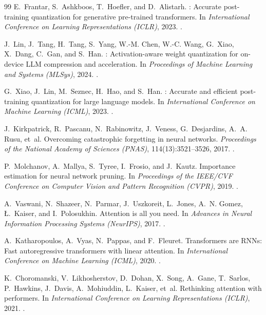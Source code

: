 \begin{thebibliography}{99}
E.~Frantar, S.~Ashkboos, T.~Hoefler, and D.~Alistarh.
: Accurate post-training quantization for generative pre-trained transformers.
\newblock In \emph{International Conference on Learning Representations (ICLR)}, 2023.
\newblock {}.

J.~Lin, J.~Tang, H.~Tang, S.~Yang, W.-M. Chen, W.-C. Wang, G.~Xiao, X.~Dang, C.~Gan, and S.~Han.
: Activation-aware weight quantization for on-device {LLM} compression and acceleration.
\newblock In \emph{Proceedings of Machine Learning and Systems (MLSys)}, 2024.
\newblock {}.

G.~Xiao, J.~Lin, M.~Seznec, H.~Hao, and S.~Han.
: Accurate and efficient post-training quantization for large language models.
\newblock In \emph{International Conference on Machine Learning (ICML)}, 2023.
\newblock {}.

J.~Kirkpatrick, R.~Pascanu, N.~Rabinowitz, J.~Veness, G.~Desjardins, A.~A. Rusu, et~al.
\newblock Overcoming catastrophic forgetting in neural networks.
\newblock \emph{Proceedings of the National Academy of Sciences (PNAS)}, 114(13):3521--3526, 2017.
\newblock {}.

P.~Molchanov, A.~Mallya, S.~Tyree, I.~Frosio, and J.~Kautz.
\newblock Importance estimation for neural network pruning.
\newblock In \emph{Proceedings of the IEEE/CVF Conference on Computer Vision and Pattern Recognition (CVPR)}, 2019.
\newblock {}.

A.~Vaswani, N.~Shazeer, N.~Parmar, J.~Uszkoreit, L.~Jones, A.~N. Gomez, {\L}.~Kaiser, and I.~Polosukhin.
\newblock Attention is all you need.
\newblock In \emph{Advances in Neural Information Processing Systems (NeurIPS)}, 2017.
\newblock {}.

A.~Katharopoulos, A.~Vyas, N.~Pappas, and F.~Fleuret.
\newblock Transformers are {RNN}s: Fast autoregressive transformers with linear attention.
\newblock In \emph{International Conference on Machine Learning (ICML)}, 2020.
\newblock {}.

K.~Choromanski, V.~Likhosherstov, D.~Dohan, X.~Song, A.~Gane, T.~Sarlos, P.~Hawkins, J.~Davis, A.~Mohiuddin, L.~Kaiser, et~al.
\newblock Rethinking attention with performers.
\newblock In \emph{International Conference on Learning Representations (ICLR)}, 2021.
\newblock {}.


\end{thebibliography}
